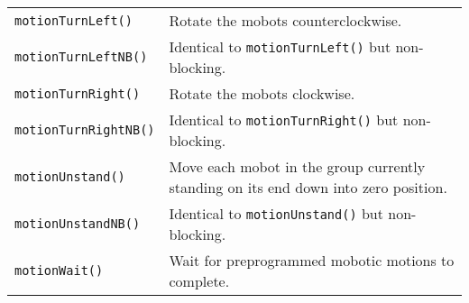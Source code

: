 \begin{tabular}{p{1.75in}p{4.5in}}
\texttt{motionTurnLeft()}  & Rotate the mobots counterclockwise. \\
\texttt{motionTurnLeftNB()}  & Identical to \texttt{motionTurnLeft()} but non-blocking. \\
\texttt{motionTurnRight()}  & Rotate the mobots clockwise. \\
\texttt{motionTurnRightNB()}  & Identical to \texttt{motionTurnRight()} but non-blocking. \\
\texttt{motionUnstand()}  & Move each mobot in the group currently standing on its end down into zero position. \\
\texttt{motionUnstandNB()}  & Identical to \texttt{motionUnstand()} but non-blocking. \\
\texttt{motionWait()}  & Wait for preprogrammed mobotic motions to complete. \\
\hline
\end{tabular}
